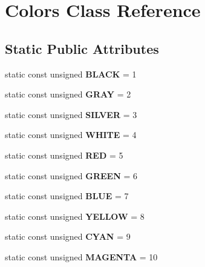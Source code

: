\hypertarget{classColors}{}\section{Colors Class Reference}
\label{classColors}
\subsection*{Static Public Attributes}
\begin{DoxyCompactItemize}
\item 
\hypertarget{classColors_a01cf6a665fe0e66e5462ace37acd428d}{}static const unsigned {\bfseries B\+L\+A\+C\+K} = 1\label{classColors_a01cf6a665fe0e66e5462ace37acd428d}

\item 
\hypertarget{classColors_a1d66700618d1bad0cb6286120747110d}{}static const unsigned {\bfseries G\+R\+A\+Y} = 2\label{classColors_a1d66700618d1bad0cb6286120747110d}

\item 
\hypertarget{classColors_a34001465db0310d6061378785fe6b77f}{}static const unsigned {\bfseries S\+I\+L\+V\+E\+R} = 3\label{classColors_a34001465db0310d6061378785fe6b77f}

\item 
\hypertarget{classColors_a88c3d5ac0c91ea16f14b4a4631619cf0}{}static const unsigned {\bfseries W\+H\+I\+T\+E} = 4\label{classColors_a88c3d5ac0c91ea16f14b4a4631619cf0}

\item 
\hypertarget{classColors_a046700ffb5fe8310004d7cdd3aa3f14c}{}static const unsigned {\bfseries R\+E\+D} = 5\label{classColors_a046700ffb5fe8310004d7cdd3aa3f14c}

\item 
\hypertarget{classColors_a87a37b010fb2b2203a29a285f793bcc4}{}static const unsigned {\bfseries G\+R\+E\+E\+N} = 6\label{classColors_a87a37b010fb2b2203a29a285f793bcc4}

\item 
\hypertarget{classColors_ae5bd79999a8ea041d2fd26abcda78ca5}{}static const unsigned {\bfseries B\+L\+U\+E} = 7\label{classColors_ae5bd79999a8ea041d2fd26abcda78ca5}

\item 
\hypertarget{classColors_ab706eb62c9c721aed157d5802717d0a8}{}static const unsigned {\bfseries Y\+E\+L\+L\+O\+W} = 8\label{classColors_ab706eb62c9c721aed157d5802717d0a8}

\item 
\hypertarget{classColors_a8e7cbfe9ab77bf753374e9039a55b3f9}{}static const unsigned {\bfseries C\+Y\+A\+N} = 9\label{classColors_a8e7cbfe9ab77bf753374e9039a55b3f9}

\item 
\hypertarget{classColors_a770dc1c7f2e675277c0eca596eb02d10}{}static const unsigned {\bfseries M\+A\+G\+E\+N\+T\+A} = 10\label{classColors_a770dc1c7f2e675277c0eca596eb02d10}

\end{DoxyCompactItemize}



